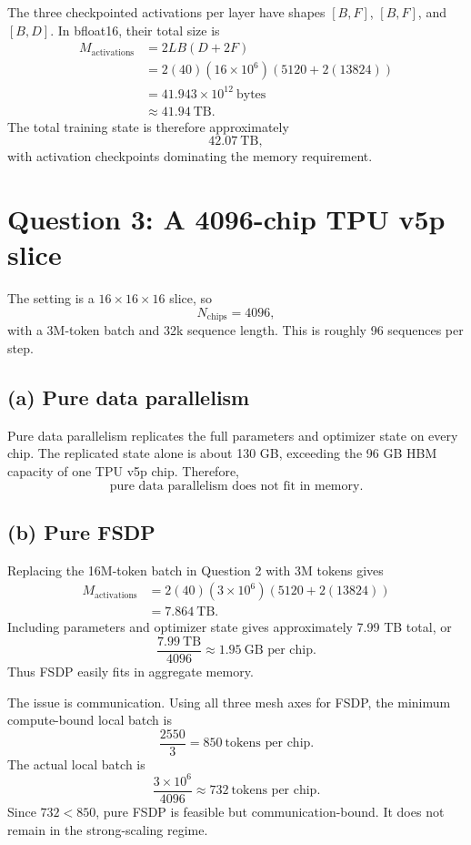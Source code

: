 \documentclass[11pt]{article}
\begin{document}
The three checkpointed activations per layer have shapes $[B,F]$, $[B,F]$,
and $[B,D]$. In bfloat16, their total size is
\begin{align*}
M_{\mathrm{activations}}
&=2LB(D+2F)\\
&=2(40)(16\times10^6)(5120+2(13824))\\
&=41.943\times10^{12}\ \text{bytes}\\
&\approx41.94\ \text{TB}.
\end{align*}
The total training state is therefore approximately
\[
\boxed{42.07\ \text{TB}},
\]
with activation checkpoints dominating the memory requirement.

\section*{Question 3: A 4096-chip TPU v5p slice}

The setting is a $16\times16\times16$ slice, so
\[
N_{\mathrm{chips}}=4096,
\]
with a 3M-token batch and 32k sequence length. This is roughly 96 sequences
per step.

\subsection*{(a) Pure data parallelism}

Pure data parallelism replicates the full parameters and optimizer state on
every chip. The replicated state alone is about 130 GB, exceeding the 96 GB
HBM capacity of one TPU v5p chip. Therefore,
\[
\boxed{\text{pure data parallelism does not fit in memory}.}
\]

\subsection*{(b) Pure FSDP}

Replacing the 16M-token batch in Question 2 with 3M tokens gives
\begin{align*}
M_{\mathrm{activations}}
&=2(40)(3\times10^6)(5120+2(13824))\\
&=7.864\ \text{TB}.
\end{align*}
Including parameters and optimizer state gives approximately 7.99 TB total,
or
\[
\frac{7.99\ \text{TB}}{4096}
\approx\boxed{1.95\ \text{GB per chip}}.
\]
Thus FSDP easily fits in aggregate memory.

The issue is communication. Using all three mesh axes for FSDP, the minimum
compute-bound local batch is
\[
\frac{2550}{3}=850\ \text{tokens per chip}.
\]
The actual local batch is
\[
\frac{3\times10^6}{4096}\approx732\ \text{tokens per chip}.
\]
Since $732<850$, pure FSDP is feasible but communication-bound. It does not
remain in the strong-scaling regime.
\end{document}
